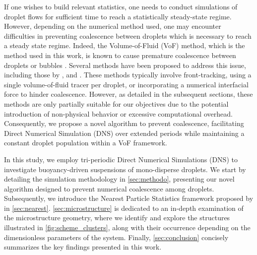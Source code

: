 \documentclass[11pt]{My_preprint}
\begin{document}
If one wishes to build relevant statistics, one needs to conduct simulations of droplet flows for sufficient time to reach a statistically steady-state regime.
However, depending on the numerical method used, one may encounter difficulties in preventing coalescence between droplets which is necessary to reach a steady state regime.
Indeed, the Volume-of-Fluid (VoF) method, which is the method used in this work, is known to cause premature coalescence between droplets or bubbles \citep{innocenti2020direct}.
Several methods have been proposed to address this issue, including those by \citet{roghair2011drag,balcazar2015multiple,hidman2023assessing,zhang2023evolution}, and \citet{karnakov2022computing}.
These methods typically involve front-tracking, using a single volume-of-fluid tracer per droplet, or incorporating a numerical interfacial force to hinder coalescence. However, as detailed in the subsequent sections, these methods are only partially suitable for our objectives due to the potential introduction of non-physical behavior or excessive computational overhead. Consequently, we propose a novel algorithm to prevent coalescence, facilitating Direct Numerical Simulation (DNS) over extended periods while maintaining a constant droplet population within a VoF framework.

In this study, we employ tri-periodic Direct Numerical Simulations (DNS) to investigate buoyancy-driven suspensions of mono-disperse droplets. We start by detailing the simulation methodology in \ref{sec:methodo}, presenting our novel algorithm designed to prevent numerical coalescence among droplets. Subsequently, we introduce the Nearest Particle Statistics framework proposed by \citet{zhang2023evolution} in \ref{sec:nearest}. \ref{sec:microstructure} is dedicated to an in-depth examination of the microstructure geometry, where we identify and explore the structures illustrated in \ref{fig:scheme_clusters}, along with their occurrence depending on the dimensionless parameters of the system. Finally, \ref{sec:conclusion} concisely summarizes the key findings presented in this work.
\end{document}

